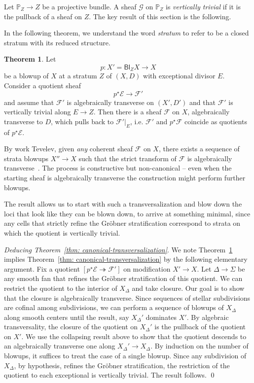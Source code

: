 \documentclass[11pt]{amsart}
\theoremstyle{definition}
\theoremstyle{definition}
\newtheorem{theorem}{Theorem}[subsection]
\begin{document}
Let $\mathbb P_Z\to Z$ be a projective bundle. A sheaf $\mathcal G$ on $\mathbb P_Z$ is {\it vertically trivial} if it is the pullback of a sheaf on $Z$. The key result of this section is the following. 

In the following theorem, we understand the word {\it stratum} to refer to be a closed stratum with its reduced structure.

\begin{theorem}\label{thm: general-collapse}
Let 
\[
p\colon X' = \mathsf{Bl}_Z X \to X
\]
be a blowup of $X$ at a stratum $Z$ of $(X,D)$ with exceptional divisor $E$. Consider a quotient sheaf
\[
p^\star \mathcal E\to \mathcal F'
\]
and assume that $\mathcal F'$ is algebraically transverse on $(X',D')$ and that $\mathcal F'$ is vertically trivial along $E\to Z$. Then there is a sheaf $\mathcal F$ on $X$, algebraically transverse to $D$, which pulls back to $\mathcal F'|_{E}$, i.e. $\mathcal F'$ and $p^\star\mathcal F$ coincide as quotients of $p^\star \mathcal E$. 
\end{theorem}


By work Tevelev, given {\it any} coherent sheaf $\mathcal F$ on $X$, there exists a sequence of strata blowups $X''\to X$ such that the strict transform of $\mathcal F$ is algebraically transverse~\cite{Logquot,tevelev2005compactifications,TevNotes,TV21}. The process is constructive but non-canonical -- even when the starting sheaf is algebraically transverse the construction might perform further blowups. 

The result allows us to start with such a transversalization and blow down the loci that look like they can be blown down, to arrive at something minimal, since any cells that strictly refine the Gr\"obner stratification correspond to strata on which the quotient is vertically trivial. 

\noindent
{\it Deducing Theorem~\ref{thm: canonical-transversalization}}. We note Theorem~\ref{thm: general-collapse} implies Theorem~\ref{thm: canonical-transversalization} by the following elementary argument. Fix a quotient $[p^\star \mathcal E\twoheadrightarrow \mathcal F']$ on modification $X'\to X$. Let $\Delta\to \Sigma$ be any smooth fan that refines the Gr\"obner stratification of this quotient. We can restrict the quotient to the interior of $X_\Delta$ and take closure. Our goal is to show that the closure is algebraically transverse. Since sequences of stellar subdivisions are cofinal among subdivisions, we can perform a sequence of blowups of $X_\Delta$ along smooth centers until the result, say $X_\Delta'$ dominates $X'$. By algebraic transversality, the closure of the quotient on $X_\Delta'$ is the pullback of the quotient on $X'$. We use the collapsing result above to show that the quotient descends to an algebraically transverse one along $X_\Delta'\to X_\Delta$. By induction on the number of blowups, it suffices to treat the case of a single blowup. Since any subdivision of $X_\Delta$, by hypothesis, refines the Gr\"obner stratification, the restriction of the quotient to each exceptional is vertically trivial. The result follows.  \qed
\end{document}
